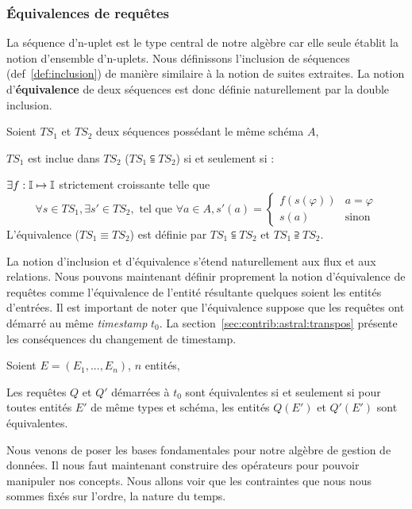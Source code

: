 \subsubsection{Équivalences de requêtes}
La séquence d'n-uplet est le type central de notre algèbre car elle seule établit la notion d'ensemble d'n-uplets. Nous définissons l'inclusion de séquences (def~\ref{def:inclusion}) de manière similaire à la notion de suites extraites. La notion d'\textbf{équivalence} de deux séquences est donc définie naturellement par la double inclusion. 
\begin{defi}\label{def:inclusion}
	Soient $TS_1$ et $TS_2$ deux séquences possédant le même schéma $A$,
	
	$TS_1$ est inclue dans $TS_2$ ($TS_1 \subseteqq TS_2$) si et seulement si : 
	
	\quad \quad $\exists f:\mathbb{I} \mapsto \mathbb{I}$ strictement croissante telle que 
$$\forall s\in TS_1, \exists s'\in TS_2, \textrm{ tel que } \forall a \in A, s'(a) = \begin{cases} f(s(\varphi)) & a = \varphi \\ s(a) & \textrm{sinon}\end{cases}$$
	L'équivalence ($TS_1 \equiv TS_2$) est définie par $TS_1 \subseteqq TS_2$ et $TS_1 \supseteqq TS_2$. 
\end{defi}%

La notion d'inclusion et d'équivalence s'étend naturellement aux flux et aux relations. Nous pouvons maintenant définir proprement la notion d'équivalence de requêtes comme l'équivalence de l'entité résultante quelques soient les entités d'entrées. Il est important de noter que l'équivalence suppose que les requêtes ont démarré au même \textit{timestamp} $t_0$. La section~\ref{sec:contrib:astral:transpos} présente les conséquences du changement de timestamp.
\begin{defi}\label{def:equivalence}
	Soient $E=(E_1, ..., E_n)$, $n$ entités,
	
	Les requêtes $Q$ et $Q'$ démarrées à $t_0$ sont équivalentes si et seulement si pour toutes entités $E'$ de même types et schéma, les entités $Q(E')$ et $Q'(E')$ sont équivalentes.
\end{defi}%

Nous venons de poser les bases fondamentales pour notre algèbre de gestion de données. Il nous faut maintenant construire des opérateurs pour pouvoir manipuler nos concepts. Nous allons voir que les contraintes que nous nous sommes fixés sur l'ordre, la nature du temps.
